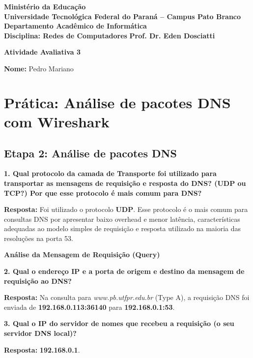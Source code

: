 \documentclass[12pt,a4paper]{article}
\newcommand{\resposta}[1]{\textbf{Resposta:} #1}
\begin{document}
\begin{center}
\textbf{Ministério da Educação}\\
\textbf{Universidade Tecnológica Federal do Paraná -- Campus Pato Branco}\\
\textbf{Departamento Acadêmico de Informática}\\[0.5em]
\textbf{Disciplina: Redes de Computadores} \hfill \textbf{Prof. Dr. Eden Dosciatti}

\vspace{1.2em}
\Large\textbf{Atividade Avaliativa 3}
\end{center}

\vspace{1em}
\noindent\textbf{Nome:} Pedro Mariano

\vspace{1.0em}
\section*{Prática: Análise de pacotes DNS com Wireshark}

\subsection*{Etapa 2: Análise de pacotes DNS}

\noindent\textbf{1. Qual protocolo da camada de Transporte foi utilizado para transportar as mensagens de requisição e resposta do DNS? (UDP ou TCP?) Por que esse protocolo é mais comum para DNS?}

\resposta{Foi utilizado o protocolo \textbf{UDP}. Esse protocolo é o mais comum para consultas DNS por apresentar baixo overhead e menor latência, características adequadas ao modelo simples de requisição e resposta utilizado na maioria das resoluções na porta 53.}

\vspace{0.8em}
\noindent\textbf{Análise da Mensagem de Requisição (Query)}

\noindent\textbf{2. Qual o endereço IP e a porta de origem e destino da mensagem de requisição ao DNS?}

\resposta{Na consulta para \textit{www.pb.utfpr.edu.br} (Type A), a requisição DNS foi enviada de \textbf{192.168.0.113:36140} para \textbf{192.168.0.1:53}.}

\vspace{0.8em}
\noindent\textbf{3. Qual o IP do servidor de nomes que recebeu a requisição (o seu servidor DNS local)?}

\resposta{\textbf{192.168.0.1}.}
\end{document}
